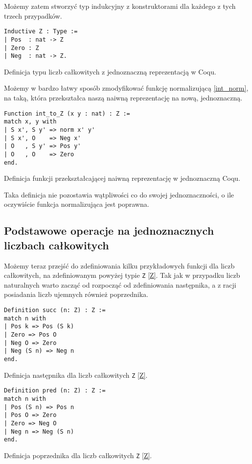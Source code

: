 Możemy zatem stworzyć typ indukcyjny z konstruktorami dla każdego z tych trzech przypadków.
\begin{code}
\begin{verbatim}
Inductive Z : Type :=
| Pos  : nat -> Z
| Zero : Z
| Neg  : nat -> Z.
\end{verbatim}
\caption{Definicja typu liczb całkowitych z jednoznaczną reprezentacją w Coqu.}
\label{Z}
\end{code}

Możemy w bardzo łatwy sposób zmodyfikować funkcję normalizującą \ref{int_norm}, na taką, która przekształca naszą naiwną reprezentację na nową, jednoznaczną. 
\begin{code}
\begin{verbatim}
Function int_to_Z (x y : nat) : Z :=
match x, y with
| S x', S y' => norm x' y'
| S x', O    => Neg x'
| O   , S y' => Pos y'
| O   , O    => Zero
end.
\end{verbatim}
\caption{Definicja funkcji przekształcającej naiwną reprezentację w jednoznaczną Coqu.}
\label{int_to_Z}
\end{code}

Taka definicja nie pozostawia wątpliwości co do swojej jednoznaczności, o ile oczywiście funkcja normalizująca jest poprawna. 
\subsection{Podstawowe operacje na jednoznacznych liczbach całkowitych}
Możemy teraz przejść do zdefiniowania kilku przykładowych funkcji dla liczb całkowitych, na zdefiniowanym powyżej typie \texttt{Z} \ref{Z}. Tak jak w przypadku liczb naturalnych warto zacząć od rozpocząć od zdefiniowania następnika, a z racji posiadania liczb ujemnych również poprzednika.
\begin{code}
\begin{verbatim}
Definition succ (n: Z) : Z :=
match n with
| Pos k => Pos (S k)
| Zero => Pos O
| Neg O => Zero
| Neg (S n) => Neg n
end.
\end{verbatim}
\caption{Definicja następnika dla liczb całkowitych \texttt{Z} \ref{Z}.}
\label{Z_succ}
\end{code}

\begin{code}
\begin{verbatim}
Definition pred (n: Z) : Z :=
match n with
| Pos (S n) => Pos n
| Pos O => Zero
| Zero => Neg O
| Neg n => Neg (S n)
end.
\end{verbatim}
\caption{Definicja poprzednika dla liczb całkowitych \texttt{Z} \ref{Z}.}
\label{Z_pred}
\end{code}

